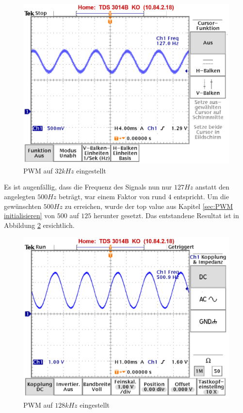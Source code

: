 \begin{figure}[H]
	\begin{center}
		\includegraphics[width=120mm]{data/TOPVAL_Stereo_500.png}
		\caption[PWM auf $32kHz$ eingestellt]{PWM auf $32kHz$ eingestellt} %
		\label{fig:PWM Topval 500 Stereo}
	\end{center}
\end{figure}


Es ist augenfällig, dass die Frequenz des Signals nun nur $127Hz$ anstatt den angelegten $500Hz$ beträgt, war einem Faktor von rund $4$ entspricht. Um die gewünschten $500Hz$ zu erreichen, wurde der top value aus Kapitel \ref{sec:PWM initialisieren} von $500$ auf $125$ herunter gesetzt. Das entstandene Resultat ist in Abbildung \ref{fig:PWM Topval 125 Stereo} ersichtlich.

\begin{figure}[H]
	\begin{center}
		\includegraphics[width=120mm]{data/TOPVAL_Stereo_125.png}
		\caption[PWM auf $128kHz$ eingestellt]{PWM auf $128kHz$ eingestellt} %
		\label{fig:PWM Topval 125 Stereo}
	\end{center}
\end{figure}

